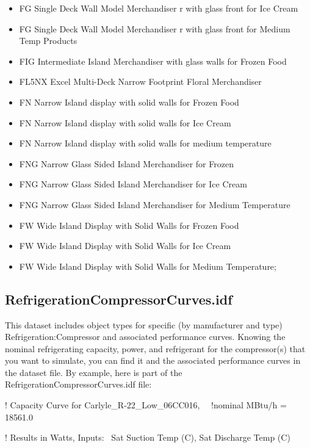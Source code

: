 \begin{itemize}
\item
  FG Single Deck Wall Model Merchandiser r with glass front for Ice Cream
\item
  FG Single Deck Wall Model Merchandiser r with glass front for Medium Temp Products
\item
  FIG Intermediate Island Merchandiser with glass walls for Frozen Food
\item
  FL5NX Excel Multi-Deck Narrow Footprint Floral Merchandiser
\item
  FN Narrow Island display with solid walls for Frozen Food
\item
  FN Narrow Island display with solid walls for Ice Cream
\item
  FN Narrow Island display with solid walls for medium temperature
\item
  FNG Narrow Glass Sided Island Merchandiser for Frozen
\item
  FNG Narrow Glass Sided Island Merchandiser for Ice Cream
\item
  FNG Narrow Glass Sided Island Merchandiser for Medium Temperature
\item
  FW Wide Island Display with Solid Walls for Frozen Food
\item
  FW Wide Island Display with Solid Walls for Ice Cream
\item
  FW Wide Island Display with Solid Walls for Medium Temperature;
\end{itemize}

\subsection{RefrigerationCompressorCurves.idf}\label{refrigerationcompressorcurves.idf}

This dataset includes object types for specific (by manufacturer and type) Refrigeration:Compressor and associated performance curves. Knowing the nominal refrigerating capacity, power, and refrigerant for the compressor(s) that you want to simulate, you can find it and the associated performance curves in the dataset file. By example, here is part of the RefrigerationCompressorCurves.idf file:

! Capacity Curve for Carlyle\_R-22\_Low\_06CC016,~~ !nominal MBtu/h = 18561.0

! Results in Watts, Inputs:~ Sat Suction Temp (C), Sat Discharge Temp (C)

